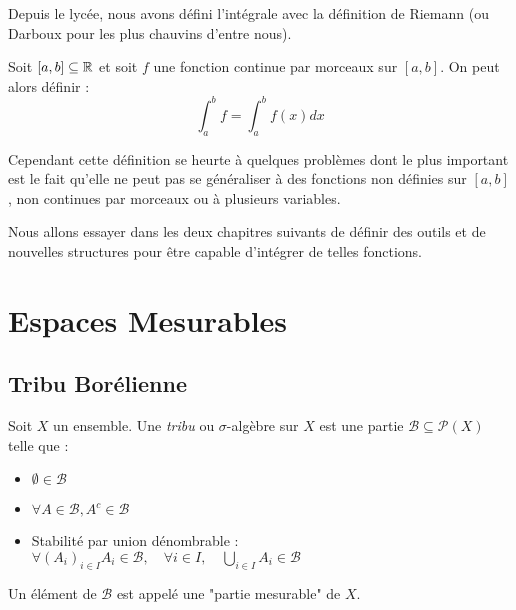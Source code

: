 
\minitoc  %

Depuis le lycée, nous avons défini l'intégrale avec la définition de Riemann (ou Darboux pour les plus chauvins d'entre nous).

\begin{remark}
    Soit $[a,b] \subseteq \mathbb{R} $ et soit $f$ une fonction continue par morceaux sur $[a,b]$. On peut alors définir :
        \[ \int_{a}^{b} f = \int_{a}^{b} f(x) dx \]
\end{remark}

Cependant cette définition se heurte à quelques problèmes dont le plus important est le fait 
qu'elle ne peut pas se généraliser à des fonctions non définies sur $[a,b]$, non continues par morceaux ou à plusieurs variables.

Nous allons essayer dans les deux chapitres suivants de définir des outils et de nouvelles structures pour 
être capable d'intégrer de telles fonctions. 


\section{Espaces Mesurables}

\subsection{Tribu Borélienne}

\begin{definition}[Tribu]
	Soit $X$ un ensemble. Une \emph{tribu} ou $\sigma$-algèbre sur $X$ est une partie 
	$\mathcal{B} \subseteq \mathcal{P}(X)$ telle que :
	\begin{itemize} 
		\item $ \emptyset \in \mathcal{B} $
		\item $ \forall A \in \mathcal{B}, A^c \in \mathcal{B} $
		\item Stabilité par union dénombrable : 
			$ \forall (A_i)_{i \in I}  A_i \in \mathcal{B}, \quad \forall i \in I, \quad \bigcup_{i \in I} A_i \in \mathcal{B} $
	\end{itemize}
Un élément de $\mathcal{B}$ est appelé une "partie mesurable" de $X$.
\end{definition}

